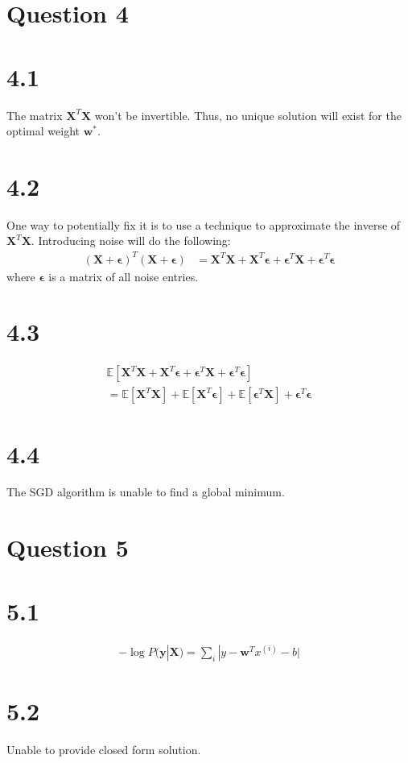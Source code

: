 \documentclass{article}
\newcommand{\abs}[1]{| #1 |}
\DeclareMathOperator*{\1}{\mathbbm{1}}
\newcommand{\E}{\mathbb E}
\newcommand{\w}{\textbf{w}}
\newcommand{\X}{\textbf{X}}
\newcommand{\y}{\textbf{y}}
\theoremstyle{definition}
\theoremstyle{remark}
\begin{document}
\section*{Question 4}
\section*{4.1}
The matrix $\textbf{X}^T\textbf{X}$ won't be invertible. Thus, no unique solution 
will exist for the optimal weight $\w^*$.
\section*{4.2}
One way to potentially fix it is to use a technique to approximate the inverse of $\textbf{X}^T\textbf{X}$.
Introducing noise will do the following:\\
\begin{align*}
    (\textbf{X} + \mathbf{\epsilon})^T(\textbf{X} + \mathbf{\epsilon})
    & = \textbf{X}^T\textbf{X} + \textbf{X}^T\mathbf{\epsilon} 
    + \mathbf{\epsilon}^T\textbf{X} + \mathbf{\epsilon}^T\mathbf{\epsilon} 
\end{align*}
where $\mathbf{\epsilon}$ is a matrix of all noise entries.
\section*{4.3}
\begin{align*}
    \E[ \textbf{X}^T\textbf{X} + \textbf{X}^T\mathbf{\epsilon} 
+ \mathbf{\epsilon}^T\textbf{X} + \mathbf{\epsilon}^T\mathbf{\epsilon}] \\
= \E[ \textbf{X}^T\textbf{X}] + \E[\textbf{X}^T\mathbf{\epsilon}]
+ \E[\mathbf{\epsilon}^T\textbf{X}] + \mathbf{\epsilon}^T\mathbf{\epsilon}
\end{align*}
\section*{4.4}
The SGD algorithm is unable to find a global minimum.
\section*{Question 5}
\section*{5.1}
\begin{align*}
    - \log P(\y|\X) = \sum_i\abs{y - \w^Tx^{(i)} - b}
\end{align*}
\section*{5.2}
Unable to provide closed form solution.
\end{document}
